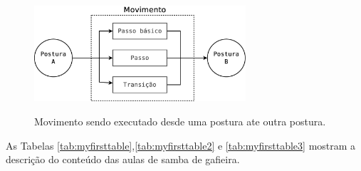 \documentclass[12pt, a4paper]{article}
\begin{document}
\begin{figure}[h]
  \centering
  \caption{ Movimento sendo executado desde uma postura ate outra postura.}
  \includegraphics[width=0.7\textwidth]{Diagrama1.eps}%
  \label{fig:mov}
\end{figure}





As Tabelas \ref{tab:myfirsttable},\ref{tab:myfirsttable2} e \ref{tab:myfirsttable3} 
mostram a descrição do conteúdo das aulas de samba de gafieira.
\end{document}
